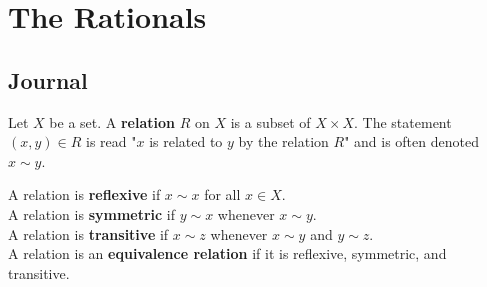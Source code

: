 \documentclass[../main.tex]{subfiles}
\begin{document}
\chapter{The Rationals}
\section{Journal}
\begin{definition}\label{dfn:2.1}
    Let $X$ be a set. A \textbf{relation} $R$ on $X$ is a subset of $X\times X$. The statement $(x,y)\in R$ is read "$x$ is related to $y$ by the relation $R$" and is often denoted $x\sim y$.\par\medskip
    \noindent A relation is \textbf{reflexive} if $x\sim x$ for all $x\in X$.\\
    A relation is \textbf{symmetric} if $y\sim x$ whenever $x\sim y$.\\
    A relation is \textbf{transitive} if $x\sim z$ whenever $x\sim y$ and $y\sim z$.\\
    A relation is an \textbf{equivalence relation} if it is reflexive, symmetric, and transitive.
\end{definition}
\smallskip
\end{document}
